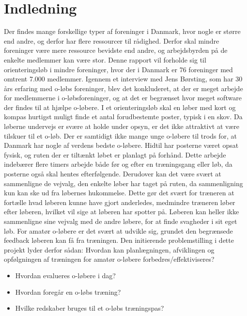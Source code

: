 \chapter{Indledning}
Der findes mange forskellige typer af foreninger i Danmark, hvor nogle er større end andre, og derfor har flere ressourcer til rådighed. Derfor skal mindre foreninger være mere ressource bevidste end andre, og arbejdsbyrden på de enkelte medlemmer kan være stor.\newline
Denne rapport vil forholde sig til orienteringsløb i mindre foreninger, hvor der i Danmark er 76 foreninger med omtrent 7.000 medlemmer\citep{DIF}. Igennem et interview med Jens Børsting, som har 30 års erfaring med o-løbs foreninger, blev det konkluderet, at der er meget arbejde for medlemmerne i o-løbsforeninger, og at det er begrænset hvor meget software der findes til at hjælpe o-løbere. \newline
I et orienteringsløb skal en løber med kort og kompas hurtigst muligt finde et antal forudbestemte poster, typisk i en skov. Da løberne undervejs er svære at holde under opsyn, er det ikke attraktivt at være tilskuer til et o-løb. Der er samtidigt ikke mange unge o-løbere til trods for, at Danmark har nogle af verdens bedste o-løbere\citep{RANK}. \newline
Hidtil har posterne været opsat fysisk, og ruten der er tiltænkt løbet er planlagt på forhånd. Dette arbejde indebærer flere timers arbejde både før og efter en træningsgang eller løb, da posterne også skal hentes efterfølgende. Derudover kan det være svært at sammenligne de vejvalg, den enkelte løber har taget på ruten, da sammenligning kun kan ske ud fra løbernes hukommelse. Dette gør det svært for træneren at fortælle hvad løberen kunne have gjort anderledes, medmindre træneren løber efter løberen, hvilket vil sige at løberen har spotter på. Løberen kan heller ikke sammenligne sine vejvalg med de andre løbere, for at finde svagheder i sit eget løb.\newline 
For amatør o-løbere er det svært at udvikle sig, grundet den begrænsede feedback løberen kan få fra træningen.\newline
Den initierende problemstilling i dette projekt lyder derfor sådan:\newline
Hvordan kan planlægningen, afviklingen og opfølgningen af træningen for amatør o-løbere forbedres/effektiviseres?
\begin{itemize}
	\item Hvordan evalueres o-løbere i dag?
	\item Hvordan foregår en o-løbs træning? 
	\item Hvilke redskaber bruges til et o-løbs træningspas?
\end{itemize} 
